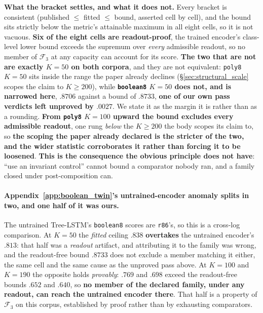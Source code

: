 \noindent\textbf{What the bracket settles, and what it does not.} Every bracket is consistent (published $\leq$ fitted $\leq$ bound, asserted cell by cell), and the bound sits strictly below the metric's attainable maximum in all eight cells, so it is not vacuous. \textbf{Six of the eight cells are readout-proof}, the trained encoder's class-level lower bound exceeds the supremum over \emph{every} admissible readout, so no member of $\mathcal{F}_3$ at any capacity can account for its score. \textbf{The two that are not are exactly $K{=}50$ on both corpora}, and they are not equivalent: \texttt{poly8} $K{=}50$ sits inside the range the paper already declines (\S\ref{sec:structural_scale} scopes the claim to $K{\geq}200$), while \textbf{\texttt{boolean8} $K{=}50$ does not, and is narrowed here}, $.8706$ against a bound of $.8733$, \textbf{one of our own pass verdicts left unproved by $.0027$}. We state it as the margin it is rather than as a rounding. \textbf{From \texttt{poly8} $K{=}100$ upward the bound excludes every admissible readout}, one rung \emph{below} the $K{\geq}200$ the body scopes its claim to, so \textbf{the scoping the paper already declared is the stricter of the two, and the wider statistic corroborates it rather than forcing it to be loosened}. \textbf{This is the consequence the obvious principle does not have}: ``use an invariant control'' cannot bound a comparator nobody ran, and a family closed under post-composition can.

\paragraph{Appendix~\ref{app:boolean_twin}'s untrained-encoder anomaly splits in two, and one half of it was ours.} The untrained Tree-LSTM's \texttt{boolean8} scores are \texttt{r86}'s, so this is a cross-log comparison. At $K{=}50$ the \emph{fitted} ceiling $.838$ \textbf{overtakes} the untrained encoder's $.813$: that half was a \emph{readout} artifact, and attributing it to the family was wrong, and the readout-free bound $.8733$ does not exclude a member matching it either, the same cell and the same cause as the unproved pass above. At $K{=}100$ and $K{=}190$ the opposite holds \emph{provably}: $.769$ and $.698$ exceed the readout-free bounds $.652$ and $.640$, so \textbf{no member of the declared family, under any readout, can reach the untrained encoder there}. That half is a property of $\mathcal{F}_3$ on this corpus, established by proof rather than by exhausting comparators.

